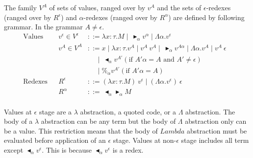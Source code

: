 \documentclass[runningheads]{llncs}
\newcommand{\TB}{\blacktriangleright}
\newcommand{\TBL}{\blacktriangleleft}
\begin{document}
\begin{definition}[Values]
	The family $V^A$ of sets of values, ranged over by $v^A$ and 
	the sets of $\epsilon$-redexes (ranged over by $R^\epsilon$) and $\alpha$-redexes (ranged over by $R^\alpha$)
	are defined by following grammar. In the grammar $A \neq \epsilon$.
	\begin{align*}
		\textrm{Values}  &  & v^\epsilon \in V^\epsilon & ::= \lambda x:\tau.M \mid\ \TB_\alpha v^\alpha \mid \Lambda\alpha.v^\epsilon                                       & \\
		                 &  & v^A \in V^A               & ::= x \mid \lambda x:\tau.v^A \mid v^A\ v^A \mid\ \TB_\alpha v^{A\alpha} \mid \Lambda\alpha.v^A \mid v^A\ \epsilon & \\
		                 &  &                           & \quad\   \mid\ \TBL_\alpha v^{A'} (\text{if } A'\alpha = A \text{ and } A' \neq \epsilon)                          & \\
		                 &  &                           & \quad\   \mid \%_\alpha v^{A'} (\text{if } A'\alpha = A)                                                           & \\
		\textrm{Redexes} &  & R^\epsilon                & ::= (\lambda x:\tau.M)\ v^\epsilon \mid (\Lambda\alpha.v^\epsilon)\ \epsilon                                       & \\
		                 &  & R^\alpha                  & ::=\ \TBL_\alpha \TB_\alpha M                                                                                      & \\
	\end{align*}
\end{definition}

Values at $\epsilon$ stage are a $\lambda$ abstraction, a quoted code, or a $\Lambda$ abstraction.
The body of a $\lambda$ abstraction can be any term but the body of $\Lambda$ abstraction only can be a value.
This restriction means that the body of $Lambda$ abstraction must be evaluated before application of an $\epsilon$ stage.
Values at non-$\epsilon$ stage includes all term except $\TBL_\alpha v^\epsilon$.
This is because $\TBL_\alpha v^\epsilon$ is a redex.
\end{document}
